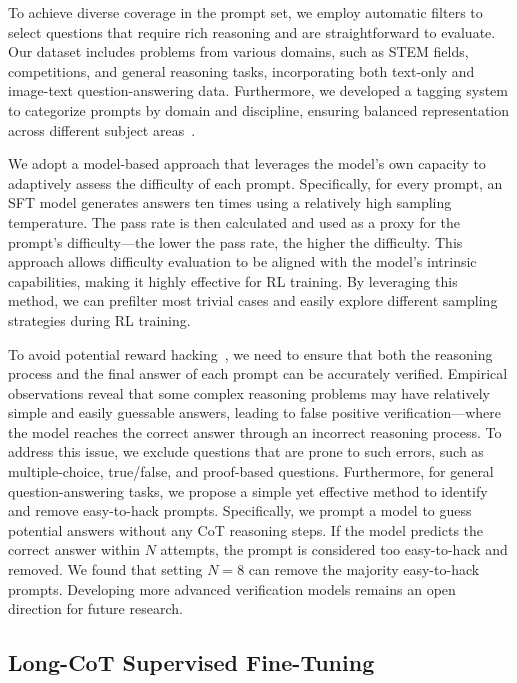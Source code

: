 \documentclass{article}
\newcommand{\citep}[1]{\parencite{#1}}
\begin{document}
To achieve diverse coverage in the prompt set, we employ automatic filters to select questions that require rich reasoning and are straightforward to evaluate.
Our dataset includes problems from various domains, such as STEM fields, competitions, and general reasoning tasks, incorporating both text-only and image-text question-answering data.
Furthermore, we developed a tagging system to categorize prompts by domain and discipline, ensuring balanced representation across different subject areas~\citep{li2023tagging,liu2023tagging}.

We adopt a model-based approach that leverages the model’s own capacity to adaptively assess the difficulty of each prompt.  
Specifically, for every prompt, an SFT model generates answers ten times using a relatively high sampling temperature. The pass rate is then calculated and used as a proxy for the prompt's difficulty—the lower the pass rate, the higher the difficulty. This approach allows difficulty evaluation to be aligned with the model’s intrinsic capabilities, making it highly effective for RL training. By leveraging this method, we can prefilter most trivial cases and easily explore different sampling strategies during RL training.

To avoid potential reward hacking~\citep{everitt2021rewardtamperingproblemssolutions,pan2022the}, we need to ensure that both the reasoning process and the final answer of each prompt can be accurately verified. 
Empirical observations reveal that some complex reasoning problems may have relatively simple and easily guessable answers, leading to false positive verification—where the model reaches the correct answer through an incorrect reasoning process.
To address this issue, we exclude questions that are prone to such errors, such as multiple-choice, true/false, and proof-based questions.
Furthermore, for general question-answering tasks, we propose a simple yet effective method to identify and remove easy-to-hack prompts.
Specifically, we prompt a model to guess potential answers without any CoT reasoning steps.
If the model predicts the correct answer within $N$ attempts, the prompt is considered too easy-to-hack and removed.
We found that setting $N=8$ can remove the majority easy-to-hack prompts. Developing more advanced verification models remains an open direction for future research.

\subsection{Long-CoT Supervised Fine-Tuning}
\label{sec:long_cot_sft}
\end{document}
